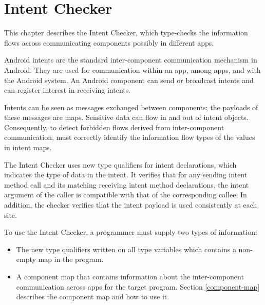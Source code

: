 \htmlhr

\newcommand{\tp}[1]{\mathit{typeof}}
\newcommand{\Fix}[1]{\textbf{[[}{\color{red} #1}\textbf{]]}}
\newcommand{\theIntentChecker}{the Intent Checker\xspace}
\newcommand{\TheIntentChecker}{The Intent Checker\xspace}
\newcommand{\sendIntent}{\<sendIntent>}
\newcommand{\onReceive}{\<onReceive>}


\chapter{Intent Checker\label{intent-checker}}

This chapter describes \theIntentChecker{},
which type-checks the information flows across communicating components possibly
in different apps.

Android intents are the standard inter-component communication
mechanism in Android. They are used for communication within an app,
among apps, and with the Android system. An Android component can
send or broadcast intents and can register interest in receiving
intents.

Intents can be seen as messages exchanged between components; the
payloads of these messages are maps. Sensitive data can flow in and
out of intent objects. Consequently, to detect forbidden flows derived
from inter-component communication, \theFlowChecker{} must correctly identify
the information flow types of the values in intent maps.

\TheIntentChecker{} uses new type qualifiers for intent
declarations, which indicates the type of data in the intent.
It verifies that for any sending intent method
call and its matching receiving intent method declarations,
the intent argument of the caller is compatible with that of the corresponding
callee. In addition, the checker verifies that the intent payload is used 
consistently at each site.

To use \theIntentChecker{}, a programmer must supply two types of information:
\begin{itemize}
\item
The new type qualifiers written on all  type variables which
contains a non-empty map in the program.

\item
A component map that contains information about the inter-component
communication across apps for the target program. Section \ref{component-map}
describes the component map and how to use it.
\end{itemize}

